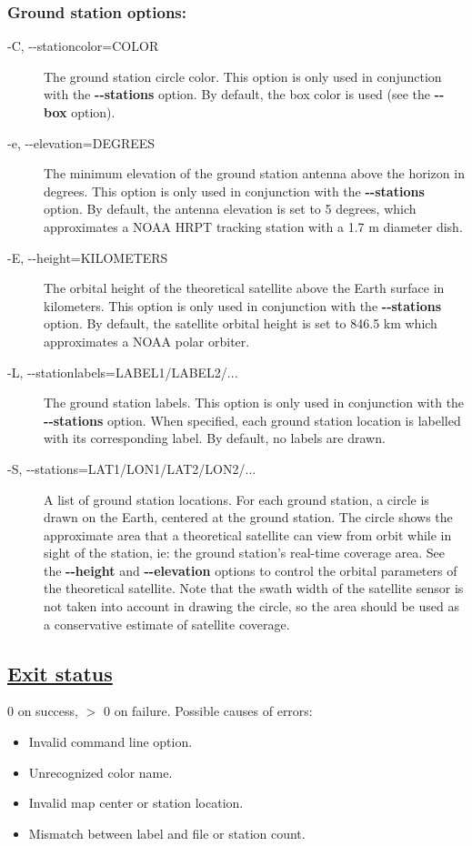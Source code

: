 \subsubsection*{Ground station options:}
\begin{description}
\item[ -C, -{-}stationcolor=COLOR ] The ground station circle color. This option is only used in conjunction with the \textbf{-{-}stations}
 option. By default, the box color is used (see the \textbf{-{-}box}
 option).
\item[ -e, -{-}elevation=DEGREES ] The minimum elevation of the ground station antenna above the horizon in degrees. This option is only used in conjunction with the \textbf{-{-}stations}
 option. By default, the antenna elevation is set to 5 degrees, which approximates a NOAA HRPT tracking station with a 1.7 m diameter dish.
\item[ -E, -{-}height=KILOMETERS ] The orbital height of the theoretical satellite above the Earth surface in kilometers. This option is only used in conjunction with the \textbf{-{-}stations}
 option. By default, the satellite orbital height is set to 846.5 km which approximates a NOAA polar orbiter.
\item[ -L, -{-}stationlabels=LABEL1/LABEL2/... ] The ground station labels. This option is only used in conjunction with the \textbf{-{-}stations}
 option. When specified, each ground station location is labelled with its corresponding label. By default, no labels are drawn.
\item[ -S, -{-}stations=LAT1/LON1/LAT2/LON2/... ] A list of ground station locations. For each ground station, a circle is drawn on the Earth, centered at the ground station. The circle shows the approximate area that a theoretical satellite can view from orbit while in sight of the station, ie: the ground station's real-time coverage area. See the \textbf{-{-}height}
 and \textbf{-{-}elevation}
 options to control the orbital parameters of the theoretical satellite. Note that the swath width of the satellite sensor is not taken into account in drawing the circle, so the area should be used as a conservative estimate of satellite coverage.

\end{description}
\subsection*{\underline{Exit status}}


  0 on success, $>$ 0 on failure. Possible causes of errors: \begin{itemize}
\item  Invalid command line option. 
\item  Unrecognized color name. 
\item  Invalid map center or station location. 
\item  Mismatch between label and file or station count. 

\end{itemize}

